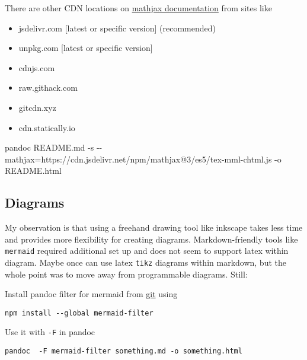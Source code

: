 \documentclass[
]{article}
\newenvironment{Shaded}{}{}
\newcommand{\AttributeTok}[1]{\textcolor[rgb]{0.49,0.56,0.16}{#1}}
\newcommand{\ExtensionTok}[1]{#1}
\newcommand{\NormalTok}[1]{#1}
\newcommand{\OperatorTok}[1]{\textcolor[rgb]{0.40,0.40,0.40}{#1}}
\providecommand{\tightlist}{%
  \setlength{\itemsep}{0pt}\setlength{\parskip}{0pt}}
\newcommand{\1}{\boldsymbol{1}}
\begin{document}
There are other CDN locations on
\href{https://docs.mathjax.org/en/latest/web/start.html\#cdn-list}{mathjax
documentation} from sites like

\begin{itemize}
\tightlist
\item
  jsdelivr.com {[}latest or specific version{]} (recommended)
\item
  unpkg.com {[}latest or specific version{]}
\item
  cdnjs.com
\item
  raw.githack.com
\item
  gitcdn.xyz
\item
  cdn.statically.io
\end{itemize}

\begin{Shaded}
\begin{Highlighting}[]
\ExtensionTok{pandoc}\NormalTok{ README.md }\AttributeTok{{-}s} \AttributeTok{{-}{-}mathjax}\OperatorTok{=}\NormalTok{https://cdn.jsdelivr.net/npm/mathjax@3/es5/tex{-}mml{-}chtml.js }\AttributeTok{{-}o}\NormalTok{   README.html}
\end{Highlighting}
\end{Shaded}

\hypertarget{diagrams}{%
\subsection{Diagrams}\label{diagrams}}

My observation is that using a freehand drawing tool like inkscape takes
less time and provides more flexibility for creating diagrams.
Markdown-friendly tools like \texttt{mermaid} required additional set up
and does not seem to support latex within diagram. Maybe once can use
latex \texttt{tikz} diagrams within markdown, but the whole point was to
move away from programmable diagrams. Still:

Install pandoc filter for mermaid from
\href{https://github.com/raghur/mermaid-filter?tab=readme-ov-file}{git}
using

\begin{verbatim}
npm install --global mermaid-filter
\end{verbatim}

Use it with \texttt{-F} in pandoc

\begin{verbatim}
pandoc  -F mermaid-filter something.md -o something.html 
\end{verbatim}
\end{document}
